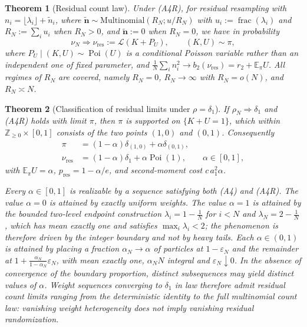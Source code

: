 \documentclass[lettersize,journal]{IEEEtran}
\newtheorem{theo}{Theorem}
\theoremstyle{remark}
\begin{document}
\begin{theo}[Residual count law]
\label{thm:res-count}
Under (A4R), for residual resampling with
$n_i=\lfloor\lambda_i\rfloor+\tilde n_i$, where
$\tilde{\bm{n}}\sim\mathrm{Multinomial}(R_N;u/R_N)$ with
$u_i:=\operatorname{frac}(\lambda_i)$ and $R_N:=\sum_iu_i$ when $R_N>0$, and
$\tilde{\bm{n}}:=0$ when $R_N=0$, we have in probability
\begin{equation}
  \nu_N\Rightarrow\nu_{\mathrm{res}}:=\mathcal{L}(K+P_U),
  \qquad (K,U)\sim\pi,
  \label{eq:res-count}
\end{equation}
where $P_U\mid(K,U)\sim\operatorname{Poi}(U)$ is a conditional Poisson
variable rather than an independent one of fixed parameter, and
$\frac1N\sum_in_i^2\to b_2(\nu_{\mathrm{res}})=r_2+\mathbb{E}_\pi U$. All
regimes of $R_N$ are covered, namely $R_N=0$, $R_N\to\infty$ with $R_N=o(N)$,
and $R_N\asymp N$.
\end{theo}

\begin{theo}[Classification of residual limits under $\rho=\delta_1$]
\label{thm:classification}
If $\rho_N\Rightarrow\delta_1$ and (A4R) holds with limit $\pi$, then $\pi$ is
supported on $\{K+U=1\}$, which within $\mathbb{Z}_{\ge0}\times[0,1]$ consists
of the two points $(1,0)$ and $(0,1)$. Consequently
\begin{align}
  \pi&=(1-\alpha)\delta_{(1,0)}+\alpha\delta_{(0,1)},\nonumber\\
  \nu_{\mathrm{res}}&=(1-\alpha)\delta_1+\alpha\operatorname{Poi}(1),
    \qquad \alpha\in[0,1],
  \label{eq:classification}
\end{align}
with $\mathbb{E}_\pi U=\alpha$, $p_{\mathrm{res}}=1-\alpha/e$, and
second-moment cost $c\,a_1^2\alpha$.

Every $\alpha\in[0,1]$ is realizable by a sequence satisfying both (A4) and
(A4R). The value $\alpha=0$ is attained by exactly uniform weights. The value
$\alpha=1$ is attained by the bounded two-level endpoint construction
$\lambda_i=1-\frac1N$ for $i<N$ and $\lambda_N=2-\frac1N$, which has mean
exactly one and satisfies $\max_i\lambda_i<2$; the phenomenon is therefore
driven by the integer boundary and not by heavy tails. Each
$\alpha\in(0,1)$ is attained by placing a fraction $\alpha_N\to\alpha$ of
particles at $1-\varepsilon_N$ and the remainder at
$1+\frac{\alpha_N}{1-\alpha_N}\varepsilon_N$, with mean exactly one,
$\alpha_NN$ integral and $\varepsilon_N\downarrow0$. In the absence of
convergence of the boundary proportion, distinct subsequences may yield
distinct values of $\alpha$. Weight sequences converging to $\delta_1$ in law therefore admit residual count limits ranging from the deterministic identity to the full multinomial count law: vanishing weight heterogeneity does not imply vanishing residual
randomization.
\end{theo}
\end{document}
